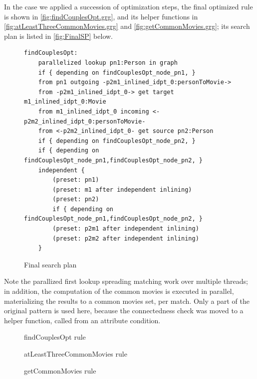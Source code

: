 In the case we applied a succession of optimization steps,
the final optimized rule is shown in \autoref{fig:findCouplesOpt.grg}, and its helper functions in \autoref{fig:atLeastThreeCommonMovies.grg} and \autoref{fig:getCommonMovies.grg}; its search plan is listed in \autoref{fig:FinalSP} below.

\begin{figure}[hptb]
	\begin{verbatim}
findCouplesOpt:
    parallelized lookup pn1:Person in graph
    if { depending on findCouplesOpt_node_pn1, }
    from pn1 outgoing -p2m1_inlined_idpt_0:personToMovie->
    from -p2m1_inlined_idpt_0-> get target m1_inlined_idpt_0:Movie
    from m1_inlined_idpt_0 incoming <-p2m2_inlined_idpt_0:personToMovie-
    from <-p2m2_inlined_idpt_0- get source pn2:Person
    if { depending on findCouplesOpt_node_pn2, }
    if { depending on findCouplesOpt_node_pn1,findCouplesOpt_node_pn2, }
    independent {
        (preset: pn1)
        (preset: m1 after independent inlining)
        (preset: pn2)
        if { depending on findCouplesOpt_node_pn1,findCouplesOpt_node_pn2, }
        (preset: p2m1 after independent inlining)
        (preset: p2m2 after independent inlining)
    }
    \end{verbatim}
	\caption{Final search plan}
	\label{fig:FinalSP}
\end{figure}

Note the parallized first lookup spreading matching work over multiple threads; in addition, the computation of the common movies is executed in parallel, materializing the results to a common movies set, per match.
Only a part of the original pattern is used here, because the connectedness check was moved to a helper function, called from an attribute condition.

\begin{figure}[hptb]
	
	\caption{findCouplesOpt rule}
	\label{fig:findCouplesOpt.grg}
\end{figure}

\begin{figure}[hptb]
	
	\caption{atLeastThreeCommonMovies rule}
	\label{fig:atLeastThreeCommonMovies.grg}
\end{figure}

\begin{figure}[hptb]
	
	\caption{getCommonMovies rule}
	\label{fig:getCommonMovies.grg}
\end{figure}
